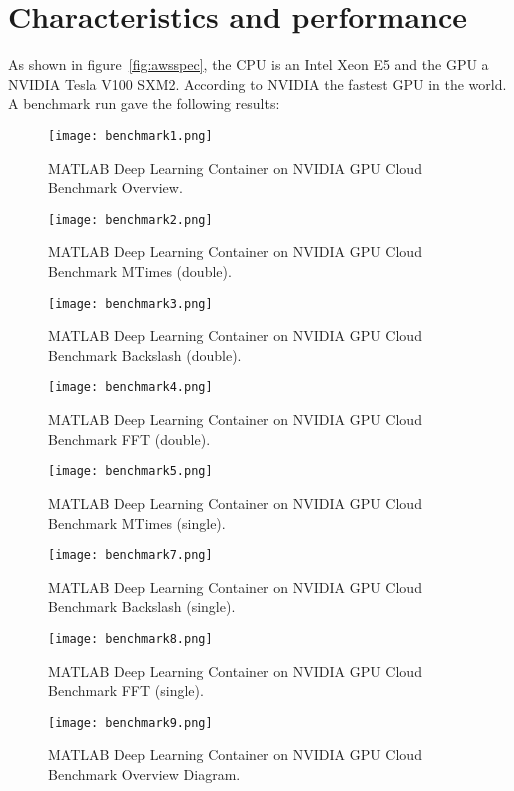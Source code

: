 \section{Characteristics and performance}
As shown in figure~\ref{fig:awsspec}, the CPU is an Intel Xeon E5 and the GPU a NVIDIA Tesla V100 SXM2.
According to NVIDIA the fastest GPU in the world.\cite{NVIDIAV181:online}
A benchmark run gave the following results:
\begin{figure}[H]
	\centering
	\texttt{[image: benchmark1.png]}
	\caption{MATLAB Deep Learning Container on NVIDIA GPU Cloud Benchmark Overview.}
\end{figure}
\begin{figure}[H]
	\centering
	\texttt{[image: benchmark2.png]}
	\caption{MATLAB Deep Learning Container on NVIDIA GPU Cloud Benchmark MTimes (double).}
\end{figure}
\begin{figure}[H]
	\centering
	\texttt{[image: benchmark3.png]}
	\caption{MATLAB Deep Learning Container on NVIDIA GPU Cloud Benchmark Backslash (double).}
\end{figure}
\begin{figure}[H]
	\centering
	\texttt{[image: benchmark4.png]}
	\caption{MATLAB Deep Learning Container on NVIDIA GPU Cloud Benchmark FFT (double).}
\end{figure}
\begin{figure}[H]
	\centering
	\texttt{[image: benchmark5.png]}
	\caption{MATLAB Deep Learning Container on NVIDIA GPU Cloud Benchmark MTimes (single).}
\end{figure}
\begin{figure}[H]
	\centering
	\texttt{[image: benchmark7.png]}
	\caption{MATLAB Deep Learning Container on NVIDIA GPU Cloud Benchmark Backslash (single).}
\end{figure}
\begin{figure}[H]
	\centering
	\texttt{[image: benchmark8.png]}
	\caption{MATLAB Deep Learning Container on NVIDIA GPU Cloud Benchmark FFT (single).}
\end{figure}
\begin{figure}[H]
	\centering
	\texttt{[image: benchmark9.png]}
	\caption{MATLAB Deep Learning Container on NVIDIA GPU Cloud Benchmark Overview Diagram.}
\end{figure}